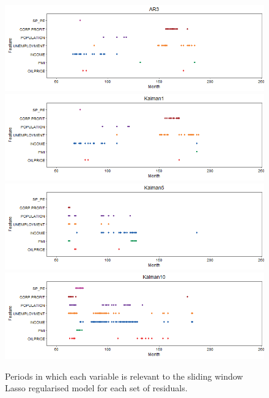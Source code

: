 \documentclass{sig-alternate-05-2015}
\begin{document}
\begin{figure}[ht]
	\centering
	\includegraphics[width=\linewidth]{TimeSeriesAR3.png}
	\includegraphics[width=\linewidth]{TimeSeriesKalman1.png}
	\includegraphics[width=\linewidth]{TimeSeriesKalman5.png}
	\includegraphics[width=\linewidth]{TimeSeriesKalman10.png}

	\caption{Periods in which each variable is relevant to the sliding window Lasso regularised model for each set of residuals.}
			\label{fig:Window}
\end{figure}
\end{document}
